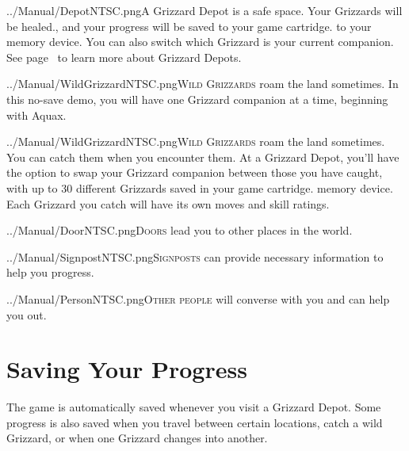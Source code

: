 \documentclass[10pt,twocolumn,openany,article]{memoir}
\newcommand\TV{NTSC}
\newcommand\TV{PAL}
\newcommand\TV{SECAM}
\begin{document}
\lettrine[image=true,                lines=5,               findent=3pt,
nindent=3pt]{../Manual/Depot\TV.png}{A} Grizzard Depot  is a safe space.
Your  Grizzards will  be  healed\ifdefined\NOSAVE{}.{}\else{}, and  your
progress will  be saved \ifdefined\ATARIAGESAVE to  your game cartridge.
\else to your  memory device. \fi You can also  switch which Grizzard is
your  current  companion.  \fi See  page~\pageref{sec:GrizzardDepot}  to
learn more about Grizzard Depots.

\ifdefined\NOSAVE

\lettrine[image=true,                lines=5,               findent=3pt,
nindent=3pt]{../Manual/WildGrizzard\TV.png}{Wild  Grizzards}   roam  the
land sometimes. In this no-save demo, you will have one Grizzard companion at a time,
beginning with  Aquax.

\else

\lettrine[image=true,                lines=5,               findent=3pt,
nindent=3pt]{../Manual/WildGrizzard\TV.png}{Wild  Grizzards}   roam  the
land  sometimes.   You  can   catch  them   when  you   encounter  them.
At  a Grizzard  Depot,  you'll have  the option  to  swap your  Grizzard
companion  between  those you  have  caught,  with  up to  30  different
Grizzards saved  in your  \ifdefined\ATARIAGESAVE game  cartridge. \else
memory device. \fi Each Grizzard you catch will have its own moves and
skill ratings. 

\fi

\lettrine[image=true,                lines=5,               findent=3pt,
nindent=3pt]{../Manual/Door\TV.png}{Doors} lead  you to other  places in
the world.

\vspace{10pt}

\lettrine[image=true,                lines=5,               findent=3pt,
nindent=3pt]{../Manual/Signpost\TV.png}{Signposts} can provide necessary
information to help you progress.


\lettrine[image=true,                lines=5,               findent=3pt,
nindent=3pt]{../Manual/Person\TV.png}{Other  people} will  converse with
you and can help you out.



\ifdefined\NOSAVE\else

\section{Saving Your Progress}

The game  is automatically  saved whenever you  visit a  Grizzard Depot.
Some progress is  also saved when you travel  between certain locations,
catch a wild Grizzard, or when one Grizzard changes into another.
\end{document}
